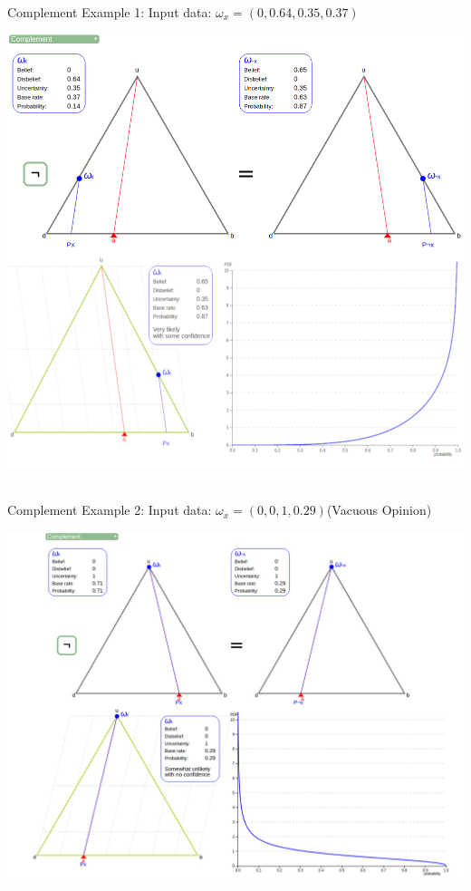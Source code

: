\documentclass[UTF8]{article}
\newcommand{\opinion}[5]{$\omega_{#1} = (#2, #3, #4, #5)$}
\begin{document}
Complement Example 1:
Input data: 
\opinion{x}{0}{0.64}{0.35}{0.37}
\begin{center}
\includegraphics[width=6in]{images/comp1.png}
\end{center}
\hrulefill\\
Complement Example 2:
Input data: 
\opinion{x}{0}{0}{1}{0.29}(Vacuous Opinion)
\begin{center}
\includegraphics[width=6in]{images/comp2.png}
\end{center}
\end{document}
